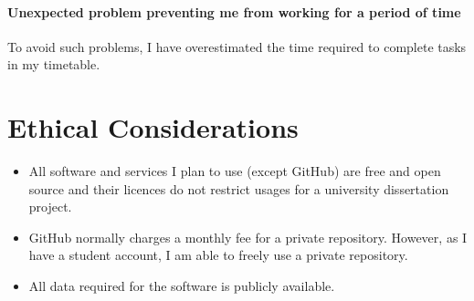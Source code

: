 \documentclass{article}
\begin{document}
	\paragraph{Unexpected problem preventing me from working for a period of time} To avoid such problems, I have overestimated the time required to complete tasks in my timetable.
	
	\section{Ethical Considerations}
	\begin{itemize}
		\item All software and services I plan to use (except GitHub) are free and open source and their licences do not restrict usages for a university dissertation project.
		\item GitHub normally charges a monthly fee for a private repository. However, as I have a student account, I am able to freely use a private repository.
		\item All data required for the software is publicly available.
	\end{itemize}

	
	
\end{document}
